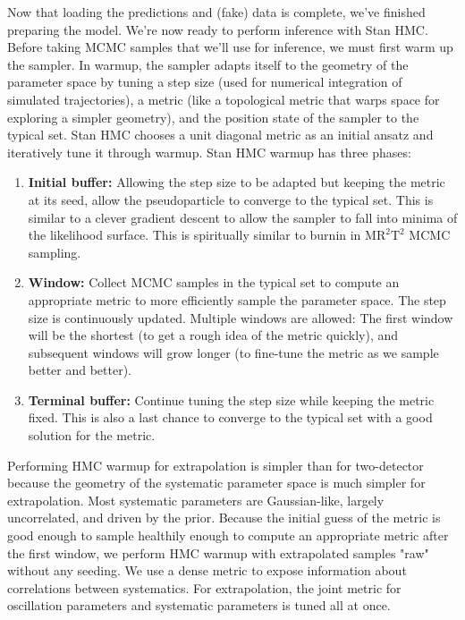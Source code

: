 \documentclass{article}
\begin{document}
Now that loading the predictions and (fake) data is complete, we've finished preparing the model. We're now ready to perform inference with Stan HMC. Before taking MCMC samples that we'll use for inference, we must first warm up the sampler. In warmup, the sampler adapts itself to the geometry of the parameter space by tuning a step size (used for numerical integration of simulated trajectories), a metric (like a topological metric that warps space for exploring a simpler geometry), and the position state of the sampler to the typical set. Stan HMC chooses a unit diagonal metric as an initial ansatz and iteratively tune it through warmup. Stan HMC warmup has three phases:
\begin{enumerate}
  \item \textbf{Initial buffer:} Allowing the step size to be adapted but keeping the metric at its seed, allow the pseudoparticle to converge to the typical set. This is similar to a clever gradient descent to allow the sampler to fall into minima of the likelihood surface. This is spiritually similar to burnin in $\mathrm{MR^2T^2}$ MCMC sampling.
  \item \textbf{Window:} Collect MCMC samples in the typical set to compute an appropriate metric to more efficiently sample the parameter space. The step size is continuously updated. Multiple windows are allowed: The first window will be the shortest (to get a rough idea of the metric quickly), and subsequent windows will grow longer (to fine-tune the metric as we sample better and better).
  \item \textbf{Terminal buffer:} Continue tuning the step size while keeping the metric fixed. This is also a last chance to converge to the typical set with a good solution for the metric.
\end{enumerate}

Performing HMC warmup for extrapolation is simpler than for two-detector because the geometry of the systematic parameter space is much simpler for extrapolation. Most systematic parameters are Gaussian-like, largely uncorrelated, and driven by the prior. Because the initial guess of the metric is good enough to sample healthily enough to compute an appropriate metric after the first window, we perform HMC warmup with extrapolated samples "raw" without any seeding. We use a dense metric to expose information about correlations between systematics. For extrapolation, the joint metric for oscillation parameters and systematic parameters is tuned all at once.
\end{document}
